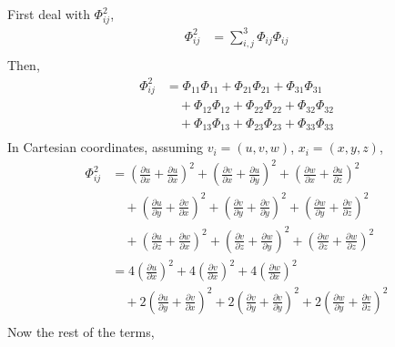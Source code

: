 \subsection{}
First deal with $\Phi^2_{ij}$,
\begin{align*}
    \Phi^2_{ij} 
    &= \sum_{i, j}^{3} \Phi_{ij} \Phi_{ij} \\
\end{align*}
Then,
\begin{align*}
    \Phi^2_{ij} 
    &= \Phi_{11} \Phi_{11} + \Phi_{21} \Phi_{21} + \Phi_{31} \Phi_{31} \\
    &\quad+ \Phi_{12} \Phi_{12} + \Phi_{22} \Phi_{22} + \Phi_{32} \Phi_{32} \\
    &\quad+ \Phi_{13} \Phi_{13} + \Phi_{23} \Phi_{23} + \Phi_{33} \Phi_{33} \\
\end{align*}
In Cartesian coordinates, assuming $v_i = (u, v, w)$, $x_i = (x, y, z)$,
\begin{align*}
    \Phi^2_{ij}
    &= \left(\frac{\partial u}{\partial x} + \frac{\partial u}{\partial x}\right)^2 
    + \left(\frac{\partial v}{\partial x} + \frac{\partial u}{\partial y}\right)^2
    + \left(\frac{\partial w}{\partial x} + \frac{\partial u}{\partial z}\right)^2 \\
    &\quad + \left(\frac{\partial u}{\partial y} + \frac{\partial v}{\partial x}\right)^2
    + \left(\frac{\partial v}{\partial y} + \frac{\partial v}{\partial y}\right)^2
    + \left(\frac{\partial w}{\partial y} + \frac{\partial v}{\partial z}\right)^2 \\
    &\quad+ \left(\frac{\partial u}{\partial z} + \frac{\partial w}{\partial x}\right)^2
    + \left(\frac{\partial v}{\partial z} + \frac{\partial w}{\partial y}\right)^2
    + \left(\frac{\partial w}{\partial z} + \frac{\partial w}{\partial z}\right)^2 \\
    &= 4 \left(\frac{\partial u}{\partial x}\right)^2 + 4 \left(\frac{\partial v}{\partial x}\right)^2 + 4 \left(\frac{\partial w}{\partial x}\right)^2 \\
    &\quad+ 2\left(\frac{\partial u}{\partial y} + \frac{\partial v}{\partial x}\right)^2 + 2\left(\frac{\partial v}{\partial y} + \frac{\partial v}{\partial y}\right)^2 
    + 2\left(\frac{\partial w}{\partial y} + \frac{\partial v}{\partial z}\right)^2 \\
\end{align*}
Now the rest of the terms,
